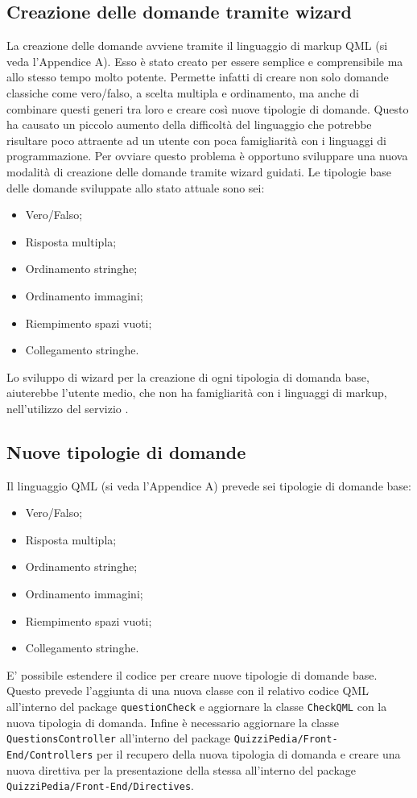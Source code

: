 \subsection{Creazione delle domande tramite wizard}
La creazione delle domande avviene tramite il linguaggio di markup QML (si veda l'Appendice A). Esso è stato creato per essere semplice e comprensibile ma allo stesso tempo molto potente. Permette infatti di creare non solo domande classiche come vero/falso, a scelta multipla e ordinamento, ma anche di combinare questi generi tra loro e creare così nuove tipologie di domande. Questo ha causato un piccolo aumento della difficoltà del linguaggio che potrebbe risultare poco attraente ad un utente con poca famigliarità con i linguaggi di programmazione. Per ovviare questo problema è opportuno sviluppare una nuova modalità di creazione delle domande tramite wizard guidati. Le tipologie base delle domande sviluppate allo stato attuale sono sei:
\begin{itemize}
	\item Vero/Falso;
	\item Risposta multipla;
	\item Ordinamento stringhe;
	\item Ordinamento immagini;
	\item Riempimento spazi vuoti;
	\item Collegamento stringhe.
\end{itemize}
Lo sviluppo di wizard per la creazione di ogni tipologia di domanda base, aiuterebbe l'utente medio, che non ha famigliarità con i linguaggi di markup, nell'utilizzo del servizio \progetto.   
\subsection{Nuove tipologie di domande}
Il linguaggio QML (si veda l'Appendice A) prevede sei tipologie di domande base:
\begin{itemize}
	\item Vero/Falso;
	\item Risposta multipla;
	\item Ordinamento stringhe;
	\item Ordinamento immagini;
	\item Riempimento spazi vuoti;
	\item Collegamento stringhe.
\end{itemize}
E' possibile estendere il codice per creare nuove tipologie di domande base. Questo prevede l'aggiunta di una nuova classe con il relativo codice QML all'interno del package \texttt{questionCheck} e aggiornare la classe \texttt{CheckQML} con la nuova tipologia di domanda. Infine è necessario aggiornare la classe \texttt{QuestionsController} all'interno del package \texttt{QuizziPedia/Front-End/Controllers} per il recupero della nuova tipologia di domanda e creare una nuova direttiva per la presentazione della stessa all'interno del package \texttt{QuizziPedia/Front-End/Directives}.
